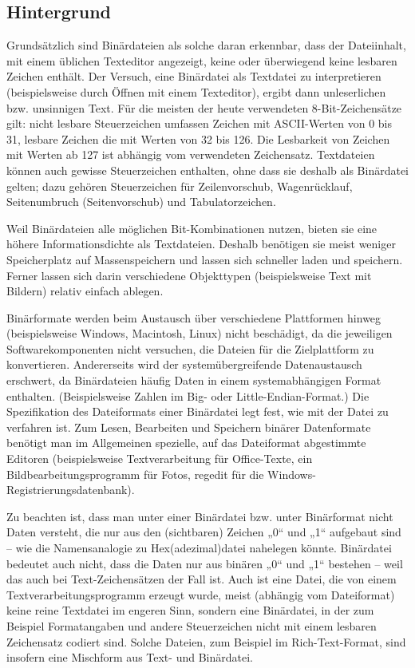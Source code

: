 \subsection{Hintergrund}
Grundsätzlich sind Binärdateien als solche daran erkennbar, dass der Dateiinhalt, mit einem üblichen Texteditor angezeigt, keine oder überwiegend keine lesbaren Zeichen enthält. Der Versuch, eine Binärdatei als Textdatei zu interpretieren (beispielsweise durch Öffnen mit einem Texteditor), ergibt dann unleserlichen bzw. unsinnigen Text. Für die meisten der heute verwendeten 8-Bit-Zeichensätze gilt: nicht lesbare Steuerzeichen umfassen Zeichen mit ASCII-Werten von 0 bis 31, lesbare Zeichen die mit Werten von 32 bis 126. Die Lesbarkeit von Zeichen mit Werten ab 127 ist abhängig vom verwendeten Zeichensatz. Textdateien können auch gewisse Steuerzeichen enthalten, ohne dass sie deshalb als Binärdatei gelten; dazu gehören Steuerzeichen für Zeilenvorschub, Wagenrücklauf, Seitenumbruch (Seitenvorschub) und Tabulatorzeichen.

Weil Binärdateien alle möglichen Bit-Kombinationen nutzen, bieten sie eine höhere Informationsdichte als Textdateien. Deshalb benötigen sie meist weniger Speicherplatz auf Massenspeichern und lassen sich schneller laden und speichern. Ferner lassen sich darin verschiedene Objekttypen (beispielsweise Text mit Bildern) relativ einfach ablegen.

Binärformate werden beim Austausch über verschiedene Plattformen hinweg (beispielsweise Windows, Macintosh, Linux) nicht beschädigt, da die jeweiligen Softwarekomponenten nicht versuchen, die Dateien für die Zielplattform zu konvertieren. Andererseits wird der systemübergreifende Datenaustausch erschwert, da Binärdateien häufig Daten in einem systemabhängigen Format enthalten. (Beispielsweise Zahlen im Big- oder Little-Endian-Format.) Die Spezifikation des Dateiformats einer Binärdatei legt fest, wie mit der Datei zu verfahren ist. Zum Lesen, Bearbeiten und Speichern binärer Datenformate benötigt man im Allgemeinen spezielle, auf das Dateiformat abgestimmte Editoren (beispielsweise Textverarbeitung für Office-Texte, ein Bildbearbeitungsprogramm für Fotos, regedit für die Windows-Registrierungsdatenbank).

Zu beachten ist, dass man unter einer Binärdatei bzw. unter Binärformat nicht Daten versteht, die nur aus den (sichtbaren) Zeichen „0“ und „1“ aufgebaut sind – wie die Namensanalogie zu Hex(adezimal)datei nahelegen könnte. Binärdatei bedeutet auch nicht, dass die Daten nur aus binären „0“ und „1“ bestehen – weil das auch bei Text-Zeichensätzen der Fall ist. Auch ist eine Datei, die von einem Textverarbeitungsprogramm erzeugt wurde, meist (abhängig vom Dateiformat) keine reine Textdatei im engeren Sinn, sondern eine Binärdatei, in der zum Beispiel Formatangaben und andere Steuerzeichen nicht mit einem lesbaren Zeichensatz codiert sind. Solche Dateien, zum Beispiel im Rich-Text-Format, sind insofern eine Mischform aus Text- und Binärdatei.\cite{bin_wikipedia}

